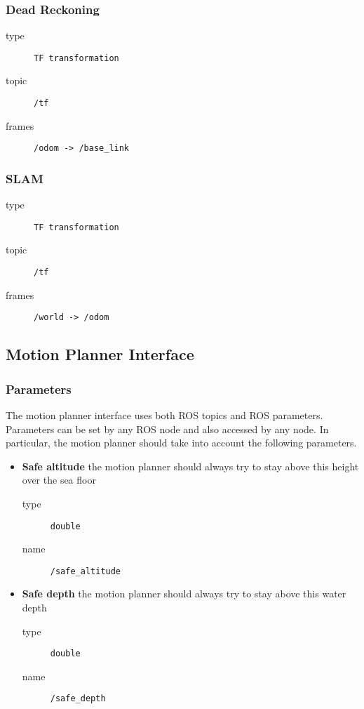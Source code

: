\documentclass[9pt,technote]{IEEEtran} %
\begin{document}
\subsubsection{Dead Reckoning}
\label{dr}

\begin{description}
\item[type] \texttt{TF transformation}
\item[topic] \texttt{/tf}
\item[frames] \texttt{/odom -> /base\_link}
\end{description}

\subsubsection{SLAM}
\label{mapping}

\begin{description}
\item[type] \texttt{TF transformation}
\item[topic] \texttt{/tf}
\item[frames] \texttt{/world -> /odom}
\end{description}

\subsection{Motion Planner Interface}
\label{planner}

\subsubsection{Parameters}

The motion planner interface uses both ROS topics and ROS parameters.
Parameters can be set by any ROS node and also accessed by any node.
In particular, the motion planner should take into account the following parameters.
\begin{itemize}
\item \textbf{Safe altitude} the motion planner should always try to stay above this height over the sea floor \begin{description}
\item[type] \texttt{double}
\item[name] \texttt{/safe\_altitude}
\end{description}
\item \textbf{Safe depth} the motion planner should always try to stay above this water depth \begin{description}
\item[type] \texttt{double}
\item[name] \texttt{/safe\_depth}
\end{description}  
\end{itemize}
\end{document}

